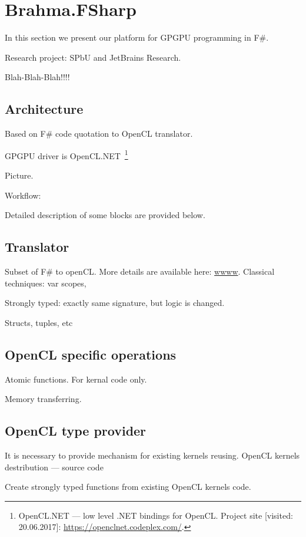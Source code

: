 \section{Brahma.FSharp}

In this section we present our platform for GPGPU programming in F\#.

Research project: SPbU and JetBrains Research.

Blah-Blah-Blah!!!!

\subsection{Architecture}

Based on F\# code quotation to OpenCL translator.

GPGPU driver is OpenCL.NET~\footnote{OpenCL.NET --- low level .NET bindings for OpenCL. Project site [visited: 20.06.2017]: \url{https://openclnet.codeplex.com/}.}

Picture.

Workflow:

Detailed description of some blocks are provided below.

\subsection{Translator}

Subset of F\# to openCL.
More details are available here: \url{wwww}.
Classical techniques: var scopes,

Strongly typed: exactly same signature, but logic is changed.

Structs, tuples, etc

\subsection{OpenCL specific operations}

Atomic functions.
For kernal code only.

Memory transferring.

\subsection{OpenCL type provider}

It is necessary to provide mechanism for existing kernels reusing.
OpenCL kernels destribution --- source code

Create strongly typed functions from existing OpenCL kernels code.

